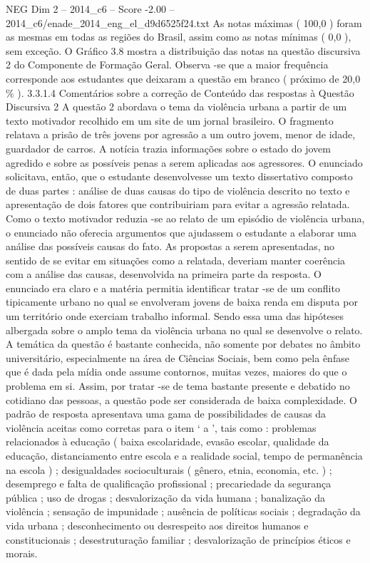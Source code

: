 \begin{textsample}{NEG Dim 2 – 2014\_c6 – Score -2.00 – 2014\_c6/enade\_2014\_eng\_el\_d9d6525f24.txt}
As notas máximas ( 100,0 ) foram as mesmas em todas as regiões do Brasil, assim como as notas mínimas ( 0,0 ), sem exceção.
O Gráfico 3.8 mostra a distribuição das notas na questão discursiva 2 do Componente de Formação Geral.
Observa -se que a maior frequência corresponde aos estudantes que deixaram a questão em branco ( próximo de 20,0 \% ). 3.3.1.4 Comentários sobre a correção de Conteúdo das respostas à Questão Discursiva 2 A questão 2 abordava o tema da violência urbana a partir de um texto motivador recolhido em um site de um jornal brasileiro.
O fragmento relatava a prisão de três jovens por agressão a um outro jovem, menor de idade, guardador de carros.
A notícia trazia informações sobre o estado do jovem agredido e sobre as possíveis penas a serem aplicadas aos agressores.
O enunciado solicitava, então, que o estudante desenvolvesse um texto dissertativo composto de duas partes : análise de duas causas do tipo de violência descrito no texto e apresentação de dois fatores que contribuiriam para evitar a agressão relatada.
Como o texto motivador reduzia -se ao relato de um episódio de violência urbana, o enunciado não oferecia argumentos que ajudassem o estudante a elaborar uma análise das possíveis causas do fato.
As propostas a serem apresentadas, no sentido de se evitar em situações como a relatada, deveriam manter coerência com a análise das causas, desenvolvida na primeira parte da resposta.
O enunciado era claro e a matéria permitia identificar tratar -se de um conflito tipicamente urbano no qual se envolveram jovens de baixa renda em disputa por um território onde exerciam trabalho informal.
Sendo essa uma das hipóteses albergada sobre o amplo tema da violência urbana no qual se desenvolve o relato.
A temática da questão é bastante conhecida, não somente por debates no âmbito universitário, especialmente na área de Ciências Sociais, bem como pela ênfase que é dada pela mídia onde assume contornos, muitas vezes, maiores do que o problema em si.
Assim, por tratar -se de tema bastante presente e debatido no cotidiano das pessoas, a questão pode ser considerada de baixa complexidade.
O padrão de resposta apresentava uma gama de possibilidades de causas da violência aceitas como corretas para o item ‘ a ’, tais como : problemas relacionados à educação ( baixa escolaridade, evasão escolar, qualidade da educação, distanciamento entre escola e a realidade social, tempo de permanência na escola ) ; desigualdades socioculturais ( gênero, etnia, economia, etc. ) ; desemprego e falta de qualificação profissional ; precariedade da segurança pública ; uso de drogas ; desvalorização da vida humana ; banalização da violência ; sensação de impunidade ; ausência de políticas sociais ; degradação da vida urbana ; desconhecimento ou desrespeito aos direitos humanos e constitucionais ; desestruturação familiar ; desvalorização de princípios éticos e morais.

\end{textsample}
